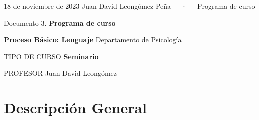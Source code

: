 \documentclass[11pt,a4paper,]{awesome-cv}
\begin{document}
\makecvheader

\makecvfooter
  {18 de noviembre de 2023}
    {Juan David Leongómez Peña~~~·~~~Programa de curso}
  {\thepage}





\vspace{4mm}
\begin{tcolorbox}[enhanced,
        on line, 
        boxsep=4pt, left=0pt,right=0pt,top=0pt,bottom=0pt,
        colframe=white,colback=black]
  
\color{white}
\begin{LARGE}\begin{center}
Documento 3. \textbf{Programa de curso}
\end{center}\end{LARGE}
\end{tcolorbox}

\begin{LARGE}\begin{center}
\textbf{Proceso Básico: Lenguaje}\linebreak
Departamento de Psicología
\end{center}\end{LARGE}

\begin{cvskills}
  \cvskill
    {TIPO DE CURSO}
    {\textbf{Seminario}}
    
  \cvskill
    {PROFESOR}
    {Juan David Leongómez}
\end{cvskills}

\hypertarget{descripciuxf3n-general}{%
\section{Descripción General}\label{descripciuxf3n-general}}
\end{document}
